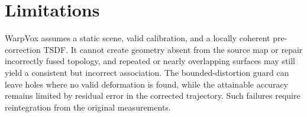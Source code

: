 \section{Limitations}
\label{sec:limitations}

WarpVox assumes a static scene, valid calibration, and a locally coherent
pre-correction TSDF. It cannot create geometry absent from the source map or
repair incorrectly fused topology, and repeated or nearly overlapping surfaces
may still yield a consistent but incorrect association. The bounded-distortion
guard can leave holes where no valid deformation is found, while the attainable
accuracy remains limited by residual error in the corrected trajectory. Such
failures require reintegration from the original measurements.

